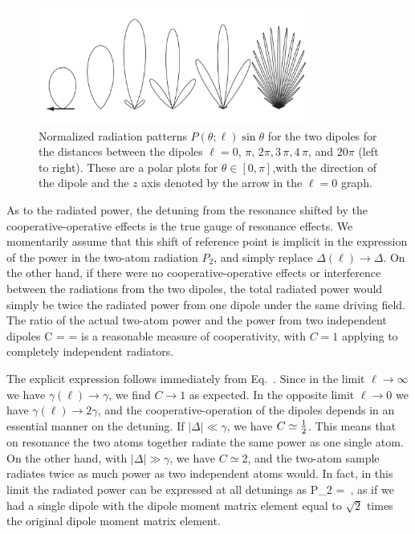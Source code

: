 \begin{figure}[h!]
\begin{center}
\includegraphics[width=0.8\textwidth]{two_atoms.pdf}
\end{center}
\caption[Radiation patterns for two dipoles]{Normalized radiation patterns $P(\theta;\ell)\sin\theta$ for the two dipoles for the distances between the dipoles $\ell=0,\,\pi,\,2\pi,3\,\pi,4\,\pi$, and $20\pi$ (left to right). These are a polar plots for $\theta\in[0,\pi]$,with the direction of the dipole and the $z$ axis denoted by the arrow in the $\ell=0$ graph.}
\label{TWOATOMS}
\end{figure}

As to the radiated power, the detuning from the resonance shifted by the cooperative-operative effects is the true gauge of resonance effects. We momentarily assume that this shift of reference point is implicit in the expression of the power in the two-atom radiation $P_2$, and simply replace $\Delta(\ell)\rightarrow\Delta$. On the other hand, if there were no cooperative-operative effects or interference between the radiations from the two dipoles, the total radiated power would simply be twice the radiated power from one dipole under the same driving field. The ratio of the actual two-atom power and the power from two independent dipoles
\beq
C =  = 
\eeq
is a reasonable measure of cooperativity, with $C=1$ applying to completely independent radiators.

The explicit expression follows immediately from Eq.~. Since in the limit $\ell\rightarrow\infty$ we have $\gamma(\ell)\rightarrow\gamma$, we find $C\rightarrow1$ as expected. In the opposite limit $\ell\rightarrow0$ we have $\gamma(\ell)\rightarrow 2\gamma$, and the cooperative-operation of the dipoles depends in an essential manner on the detuning. If $|\Delta|\ll\gamma$, we have $C\simeq{\hbox{$\frac{1}{2}$}}$. This means that on resonance the two atoms together radiate the same power as one single atom. On the other hand, with $|\Delta|\gg\gamma$, we have $C\simeq2$, and the two-atom sample radiates twice as much power as two independent atoms would. In fact, in this limit the radiated power can be expressed at all detunings as
\beq
P_2 = \,,
\eeq
as if we had a single dipole with the dipole moment matrix element equal to $\sqrt2$ times the original dipole moment matrix element.

